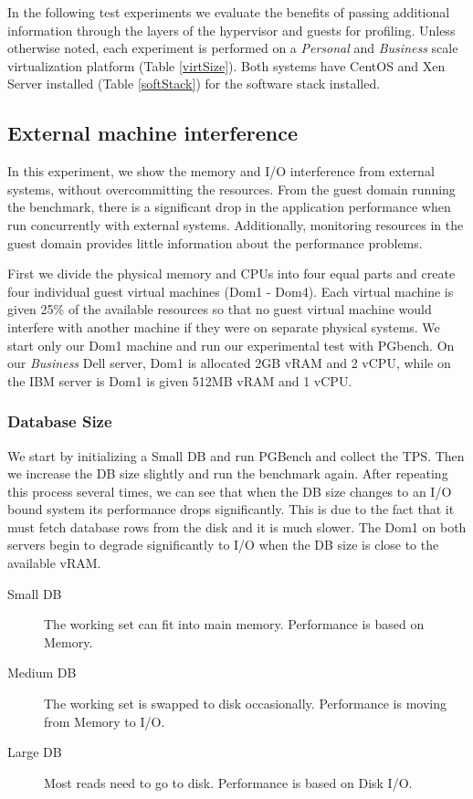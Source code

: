 In the following test experiments we evaluate the benefits of passing additional information through the layers of the hypervisor and guests for profiling.  Unless otherwise noted, each experiment is performed on a \emph{Personal} and \emph{Business} scale virtualization platform (Table \ref{virtSize}).  Both systems have CentOS and Xen Server installed (Table \ref{softStack}) for the software stack installed.

\subsection{External machine interference}
In this experiment, we show the memory and I/O interference from external systems, without overcommitting the resources.  From the guest domain running the benchmark, there is a significant drop in the application performance when run concurrently with external systems.  Additionally, monitoring resources in the guest domain provides little information about the performance problems. 

First we divide the physical memory and CPUs into four equal parts and create four individual guest virtual machines (Dom1 - Dom4).  Each virtual machine is given 25\% of the available resources so that no guest virtual machine would interfere with another machine if they were on separate physical systems.  We start only our Dom1 machine and run our experimental test with PGbench.  On our \emph{Business} Dell server, Dom1 is allocated 2GB vRAM and 2 vCPU, while on the IBM server is Dom1 is given 512MB vRAM and 1 vCPU.  

\subsubsection{Database Size}
We start by initializing a Small DB and run PGBench and collect the TPS.  Then we increase the DB size slightly and run the benchmark again.  After repeating this process several times, we can see that when the DB size changes to an I/O bound system its performance drops significantly.  This is due to the fact that it must fetch database rows from the disk and it is much slower.  The Dom1 on both servers begin to degrade significantly to I/O when the DB size is close to the available vRAM.

\begin{description}
  \item[Small DB] The working set can fit into main memory.  Performance is based on Memory.
  \item[Medium DB] The working set is swapped to disk occasionally. Performance is moving from Memory to I/O.
  \item[Large DB] Most reads need to go to disk.  Performance is based on Disk I/O.
\end{description}

